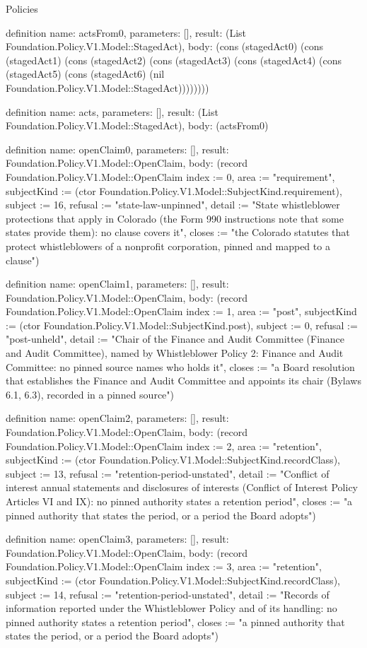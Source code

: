\begin{lexlean}{Policies}
\begin{semanticmodule}
definition{
  name: actsFrom0,
  parameters: [],
  result: (List Foundation.Policy.V1.Model::StagedAct),
  body: (cons (stagedAct0) (cons (stagedAct1) (cons (stagedAct2) (cons (stagedAct3) (cons (stagedAct4) (cons (stagedAct5) (cons (stagedAct6) (nil Foundation.Policy.V1.Model::StagedAct))))))))
}

definition{
  name: acts,
  parameters: [],
  result: (List Foundation.Policy.V1.Model::StagedAct),
  body: (actsFrom0)
}

definition{
  name: openClaim0,
  parameters: [],
  result: Foundation.Policy.V1.Model::OpenClaim,
  body: (record Foundation.Policy.V1.Model::OpenClaim {index := 0, area := "requirement", subjectKind := (ctor Foundation.Policy.V1.Model::SubjectKind.requirement), subject := 16, refusal := "state-law-unpinned", detail := "State whistleblower protections that apply in Colorado (the Form 990 instructions note that some states provide them): no clause covers it", closes := "the Colorado statutes that protect whistleblowers of a nonprofit corporation, pinned and mapped to a clause"})
}

definition{
  name: openClaim1,
  parameters: [],
  result: Foundation.Policy.V1.Model::OpenClaim,
  body: (record Foundation.Policy.V1.Model::OpenClaim {index := 1, area := "post", subjectKind := (ctor Foundation.Policy.V1.Model::SubjectKind.post), subject := 0, refusal := "post-unheld", detail := "Chair of the Finance and Audit Committee (Finance and Audit Committee), named by Whistleblower Policy 2: Finance and Audit Committee: no pinned source names who holds it", closes := "a Board resolution that establishes the Finance and Audit Committee and appoints its chair (Bylaws 6.1, 6.3), recorded in a pinned source"})
}

definition{
  name: openClaim2,
  parameters: [],
  result: Foundation.Policy.V1.Model::OpenClaim,
  body: (record Foundation.Policy.V1.Model::OpenClaim {index := 2, area := "retention", subjectKind := (ctor Foundation.Policy.V1.Model::SubjectKind.recordClass), subject := 13, refusal := "retention-period-unstated", detail := "Conflict of interest annual statements and disclosures of interests (Conflict of Interest Policy Articles VI and IX): no pinned authority states a retention period", closes := "a pinned authority that states the period, or a period the Board adopts"})
}

definition{
  name: openClaim3,
  parameters: [],
  result: Foundation.Policy.V1.Model::OpenClaim,
  body: (record Foundation.Policy.V1.Model::OpenClaim {index := 3, area := "retention", subjectKind := (ctor Foundation.Policy.V1.Model::SubjectKind.recordClass), subject := 14, refusal := "retention-period-unstated", detail := "Records of information reported under the Whistleblower Policy and of its handling: no pinned authority states a retention period", closes := "a pinned authority that states the period, or a period the Board adopts"})
}


\end{semanticmodule}
\end{lexlean}
